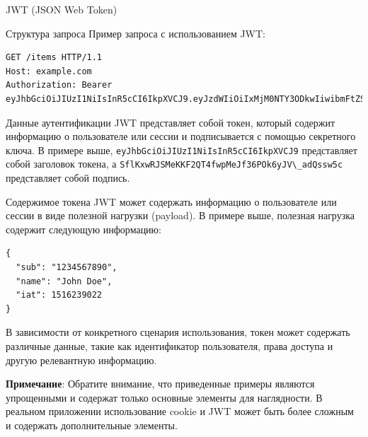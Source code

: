 \documentclass[
  ignorenonframetext,
  aspectratio=169,
  aspectratio=169]{beamer}
\newcommand{\passthrough}[1]{#1}
\begin{document}
\begin{frame}[fragile]{JWT (JSON Web Token)}
\protect\hypertarget{jwt-json-web-token}{}
\begin{block}{Структура запроса}
\protect\hypertarget{ux441ux442ux440ux443ux43aux442ux443ux440ux430-ux437ux430ux43fux440ux43eux441ux430-1}{}
Пример запроса с использованием JWT:

\begin{lstlisting}
GET /items HTTP/1.1
Host: example.com
Authorization: Bearer eyJhbGciOiJIUzI1NiIsInR5cCI6IkpXVCJ9.eyJzdWIiOiIxMjM0NTY3ODkwIiwibmFtZSI6IkpvaG4gRG9lIiwiaWF0IjoxNTE2MjM5MDIyfQ.SflKxwRJSMeKKF2QT4fwpMeJf36POk6yJV_adQssw5c
\end{lstlisting}
\end{block}

\begin{block}{Данные аутентификации}
\protect\hypertarget{ux434ux430ux43dux43dux44bux435-ux430ux443ux442ux435ux43dux442ux438ux444ux438ux43aux430ux446ux438ux438-1}{}
JWT представляет собой токен, который содержит информацию о пользователе
или сессии и подписывается с помощью секретного ключа. В примере выше,
\passthrough{\lstinline!eyJhbGciOiJIUzI1NiIsInR5cCI6IkpXVCJ9!}
представляет собой заголовок токена, а
\passthrough{\lstinline!SflKxwRJSMeKKF2QT4fwpMeJf36POk6yJV\_adQssw5c!}
представляет собой подпись.
\end{block}

\begin{block}{Содержимое токена}
\protect\hypertarget{ux441ux43eux434ux435ux440ux436ux438ux43cux43eux435-ux442ux43eux43aux435ux43dux430}{}
JWT может содержать информацию о пользователе или сессии в виде полезной
нагрузки (payload). В примере выше, полезная нагрузка содержит следующую
информацию:

\begin{lstlisting}
{
  "sub": "1234567890",
  "name": "John Doe",
  "iat": 1516239022
}
\end{lstlisting}

В зависимости от конкретного сценария использования, токен может
содержать различные данные, такие как идентификатор пользователя, права
доступа и другую релевантную информацию.

\textbf{Примечание}: Обратите внимание, что приведенные примеры являются
упрощенными и содержат только основные элементы для наглядности. В
реальном приложении использование cookie и JWT может быть более сложным
и содержать дополнительные элементы.
\end{block}
\end{frame}
\end{document}
